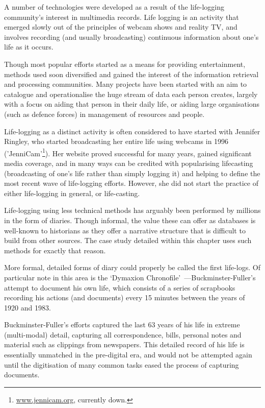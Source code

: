 A number of technologies were developed as a result of the life-logging community's interest in multimedia records.  Life logging is an activity that emerged slowly out of the principles of webcam shows and reality TV, and involves recording (and usually broadcasting) continuous information about one's life as it occurs.

Though most popular efforts started as a means for providing entertainment, methods used soon diversified and gained the interest of the information retrieval and processing communities.  Many projects have been started with an aim to catalogue and operationalise the huge stream of data each person creates, largely with a focus on aiding that person in their daily life, or aiding large organisations (such as defence forces) in management of resources and people.





Life-logging as a distinct activity is often considered to have started with Jennifer Ringley, who started broadcasting her entire life using webcams in 1996 ('JenniCam'\footnote{\url{www.jennicam.org}, currently down.}).  Her website proved successful for many years, gained significant media coverage, and in many ways can be credited with popularising lifecasting (broadcasting of one's life rather than simply logging it) and helping to define the most recent wave of life-logging efforts.  However, she did not start the practice of either life-logging in general, or life-casting.


Life-logging using less technical methods has arguably been performed by millions in the form of diaries.  Though informal, the value these can offer as databases is well-known to historians as they offer a narrative structure that is difficult to build from other sources. The case study detailed within this chapter uses such methods for exactly that reason.


More formal, detailed forms of diary could properly be called the first life-logs.  Of particular note in this area is the `Dymaxion Chronofile'~\cite{buckminsterFullerPapers}---Buckminster-Fuller's attempt to document his own life, which consists of a series of scrapbooks recording his actions (and documents) every 15 minutes between the years of 1920 and 1983.

Buckminster-Fuller's efforts captured the last 63 years of his life in extreme (multi-modal) detail, capturing all correspondence, bills, personal notes and material such as clippings from newspapers.  This detailed record of his life is essentially unmatched in the pre-digital era, and would not be attempted again until the digitisation of many common tasks eased the process of capturing documents.


